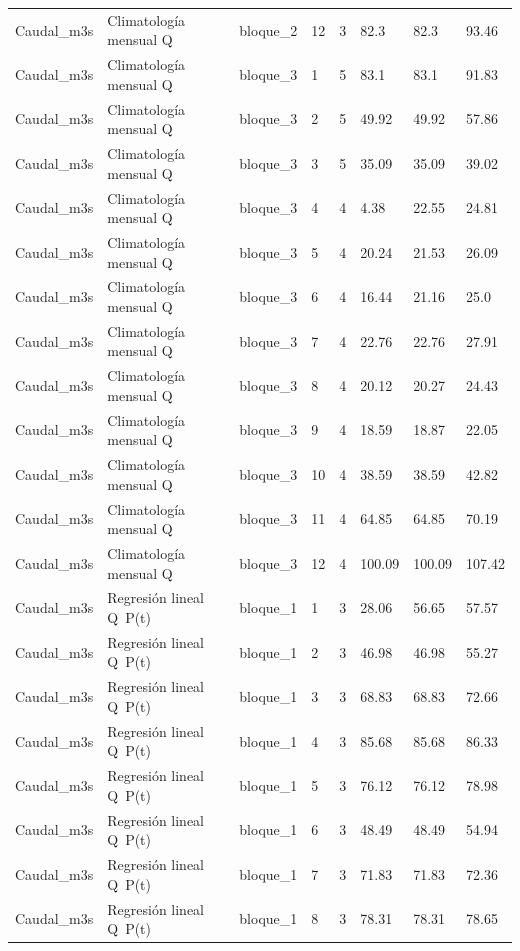 \begin{longtable}{llllllll}
Caudal\_m3s & Climatología mensual Q & bloque\_2 & 12 & 3 & 82.3 & 82.3 & 93.46 \\
Caudal\_m3s & Climatología mensual Q & bloque\_3 & 1 & 5 & 83.1 & 83.1 & 91.83 \\
Caudal\_m3s & Climatología mensual Q & bloque\_3 & 2 & 5 & 49.92 & 49.92 & 57.86 \\
Caudal\_m3s & Climatología mensual Q & bloque\_3 & 3 & 5 & 35.09 & 35.09 & 39.02 \\
Caudal\_m3s & Climatología mensual Q & bloque\_3 & 4 & 4 & 4.38 & 22.55 & 24.81 \\
Caudal\_m3s & Climatología mensual Q & bloque\_3 & 5 & 4 & 20.24 & 21.53 & 26.09 \\
Caudal\_m3s & Climatología mensual Q & bloque\_3 & 6 & 4 & 16.44 & 21.16 & 25.0 \\
Caudal\_m3s & Climatología mensual Q & bloque\_3 & 7 & 4 & 22.76 & 22.76 & 27.91 \\
Caudal\_m3s & Climatología mensual Q & bloque\_3 & 8 & 4 & 20.12 & 20.27 & 24.43 \\
Caudal\_m3s & Climatología mensual Q & bloque\_3 & 9 & 4 & 18.59 & 18.87 & 22.05 \\
Caudal\_m3s & Climatología mensual Q & bloque\_3 & 10 & 4 & 38.59 & 38.59 & 42.82 \\
Caudal\_m3s & Climatología mensual Q & bloque\_3 & 11 & 4 & 64.85 & 64.85 & 70.19 \\
Caudal\_m3s & Climatología mensual Q & bloque\_3 & 12 & 4 & 100.09 & 100.09 & 107.42 \\
Caudal\_m3s & Regresión lineal Q~P(t) & bloque\_1 & 1 & 3 & 28.06 & 56.65 & 57.57 \\
Caudal\_m3s & Regresión lineal Q~P(t) & bloque\_1 & 2 & 3 & 46.98 & 46.98 & 55.27 \\
Caudal\_m3s & Regresión lineal Q~P(t) & bloque\_1 & 3 & 3 & 68.83 & 68.83 & 72.66 \\
Caudal\_m3s & Regresión lineal Q~P(t) & bloque\_1 & 4 & 3 & 85.68 & 85.68 & 86.33 \\
Caudal\_m3s & Regresión lineal Q~P(t) & bloque\_1 & 5 & 3 & 76.12 & 76.12 & 78.98 \\
Caudal\_m3s & Regresión lineal Q~P(t) & bloque\_1 & 6 & 3 & 48.49 & 48.49 & 54.94 \\
Caudal\_m3s & Regresión lineal Q~P(t) & bloque\_1 & 7 & 3 & 71.83 & 71.83 & 72.36 \\
Caudal\_m3s & Regresión lineal Q~P(t) & bloque\_1 & 8 & 3 & 78.31 & 78.31 & 78.65 \\

\end{longtable}
